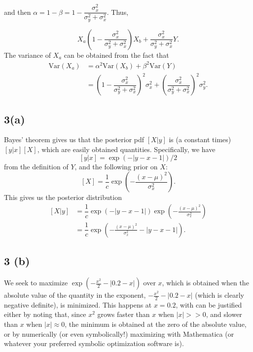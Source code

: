 \documentclass[11pt]{article}
\begin{document}
and then $\alpha = 1 - \beta = 1 -  \dfrac{\sigma_x^2}{\sigma_y^2 + \sigma_x^2}$. Thus,

\[
X_a  \left( 1 - \dfrac{\sigma_x^2}{\sigma_y^2 + \sigma_x^2}\right) X_b +  \dfrac{\sigma_x^2}{\sigma_y^2 + \sigma_x^2} Y.
\]
The variance of $X_a$ can be obtained from the fact that 
\[
\begin{aligned}
\mathrm{Var}(X_a) &= \alpha^2\mathrm{Var}(X_b) + \beta^2 \mathrm{Var}(Y)\\
&= \left( 1 - \dfrac{\sigma_x^2}{\sigma_y^2 + \sigma_x^2}\right)^2 \sigma_x^2 + \left(\dfrac{\sigma_x^2}{\sigma_y^2 + \sigma_x^2}\right)^2\sigma_y^2.
\end{aligned}
\]

\subsection*{3(a)} Bayes' theorem gives us that the posterior pdf $[X | y]$ is (a constant times) $[y | x][X]$, which are easily obtained quantities. Specifically, we have 
\[
[y | x] = \exp(- |y - x - 1|)/2
\]
from the definition of $Y$, and the following prior on $X$:
\[
[X] = \dfrac{1}{c}\exp(-\frac{(x - \mu)^2}{\sigma_x^2}).
\]
This gives us the posterior distribution 
\[
\begin{aligned}
[X | y] &= \dfrac{1}{c} \exp(- |y - x - 1|)\exp(-\frac{(x - \mu)^2}{\sigma_x^2})\\
&= \dfrac{1}{c}\exp\left(-\frac{(x - \mu)^2}{\sigma_x^2} - |y - x - 1|\right).
\end{aligned}
\]

\subsection*{3 (b)} We seek to maximize $\exp\left(-\frac{x^2}{2} - |0.2 - x |\right)$ over $x$, which is obtained when the absolute value of the quantity in the exponent, $-\frac{x^2}{2} - |0.2 - x |$ (which is clearly negative definite), is minimized. This happens at $x = 0.2$, with can be justified either by noting that, since $x^2$ grows faster than $x$ when $|x| >> 0$, and slower than $x$ when $|x|\approx 0$, the minimum is obtained at the zero of the absolute value, or by numerically (or even symbolically!) maximizing with Mathematica (or whatever your preferred symbolic optimization software is). 
\end{document}
